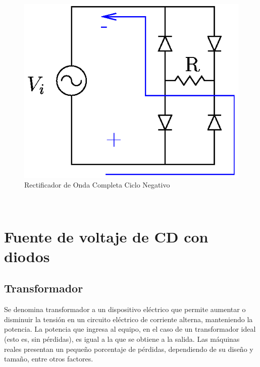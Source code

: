 \documentclass{article}
\begin{document}
\begin{figure}[htbp]
\centering
\includegraphics{images/puentediodos2neg.png}
\caption{Rectificador de Onda Completa Ciclo Negativo}
\end{figure}


    \begin{center}
    \end{center}
    { \hspace*{\fill} \\}
    
    \section{Fuente de voltaje de CD con
diodos}\label{fuente-de-voltaje-de-cd-con-diodos}

\subsection{Transformador}\label{transformador}

Se denomina transformador a un dispositivo eléctrico que permite
aumentar o disminuir la tensión en un circuito eléctrico de corriente
alterna, manteniendo la potencia. La potencia que ingresa al equipo, en
el caso de un transformador ideal (esto es, sin pérdidas), es igual a la
que se obtiene a la salida. Las máquinas reales presentan un pequeño
porcentaje de pérdidas, dependiendo de su diseño y tamaño, entre otros
factores.
\end{document}
